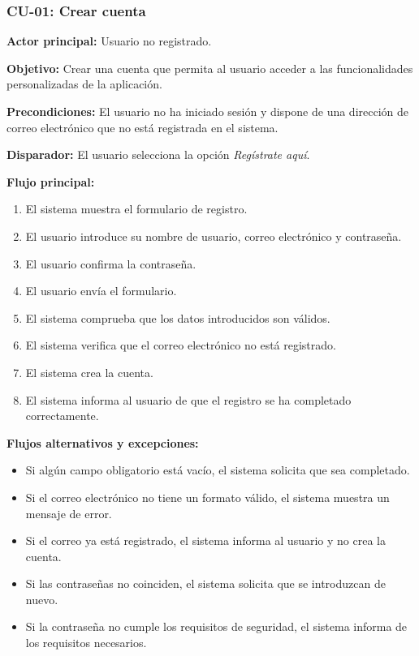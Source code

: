 \subsubsection{CU-01: Crear cuenta}

\noindent \textbf{Actor principal:} Usuario no registrado.

\noindent \textbf{Objetivo:} Crear una cuenta que permita al usuario acceder a las funcionalidades personalizadas de la aplicación.

\noindent \textbf{Precondiciones:} El usuario no ha iniciado sesión y dispone de una dirección de correo electrónico que no está registrada en el sistema.

\noindent \textbf{Disparador:} El usuario selecciona la opción \textit{Regístrate aquí}.

\noindent \textbf{Flujo principal:}
\begin{enumerate}
    \item El sistema muestra el formulario de registro.
    \item El usuario introduce su nombre de usuario, correo electrónico y contraseña.
    \item El usuario confirma la contraseña.
    \item El usuario envía el formulario.
    \item El sistema comprueba que los datos introducidos son válidos.
    \item El sistema verifica que el correo electrónico no está registrado.
    \item El sistema crea la cuenta.
    \item El sistema informa al usuario de que el registro se ha completado correctamente.
\end{enumerate}

\noindent \textbf{Flujos alternativos y excepciones:}
\begin{itemize}
    \item Si algún campo obligatorio está vacío, el sistema solicita que sea completado.
    \item Si el correo electrónico no tiene un formato válido, el sistema muestra un mensaje de error.
    \item Si el correo ya está registrado, el sistema informa al usuario y no crea la cuenta.
    \item Si las contraseñas no coinciden, el sistema solicita que se introduzcan de nuevo.
    \item Si la contraseña no cumple los requisitos de seguridad, el sistema informa de los requisitos necesarios.
\end{itemize}

